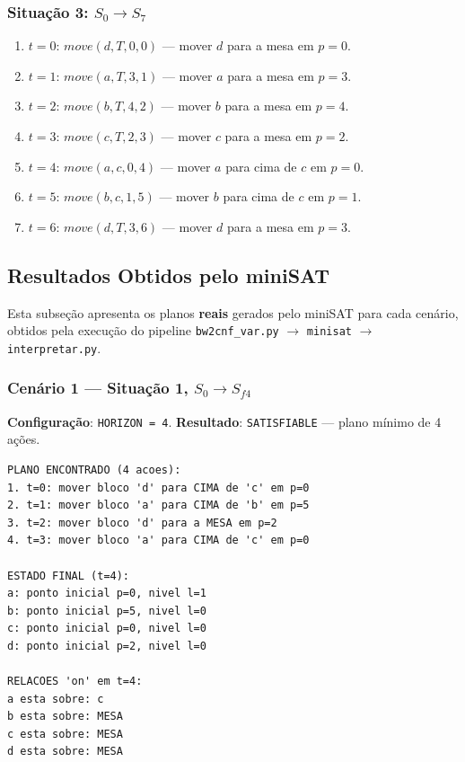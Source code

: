 \documentclass[12pt,a4paper]{article}
\begin{document}
\subsubsection{Situação 3: $S_0 \to S_7$}

\begin{enumerate}[leftmargin=1.2cm]
    \item $t=0$: $move(d, T, 0, 0)$ — mover $d$ para a mesa em $p=0$.
    \item $t=1$: $move(a, T, 3, 1)$ — mover $a$ para a mesa em $p=3$.
    \item $t=2$: $move(b, T, 4, 2)$ — mover $b$ para a mesa em $p=4$.
    \item $t=3$: $move(c, T, 2, 3)$ — mover $c$ para a mesa em $p=2$.
    \item $t=4$: $move(a, c, 0, 4)$ — mover $a$ para cima de $c$ em $p=0$.
    \item $t=5$: $move(b, c, 1, 5)$ — mover $b$ para cima de $c$ em $p=1$.
    \item $t=6$: $move(d, T, 3, 6)$ — mover $d$ para a mesa em $p=3$.
\end{enumerate}

\subsection{Resultados Obtidos pelo miniSAT}

Esta subseção apresenta os planos \textbf{reais} gerados pelo miniSAT para cada cenário, obtidos pela execução do pipeline \texttt{bw2cnf\_var.py} $\to$ \texttt{minisat} $\to$ \texttt{interpretar.py}.

\subsubsection{Cenário 1 — Situação 1, $S_0 \to S_{f4}$}

\textbf{Configuração}: \texttt{HORIZON = 4}. \textbf{Resultado}: \texttt{SATISFIABLE} — plano mínimo de 4 ações.

\begin{lstlisting}
PLANO ENCONTRADO (4 acoes):
1. t=0: mover bloco 'd' para CIMA de 'c' em p=0
2. t=1: mover bloco 'a' para CIMA de 'b' em p=5
3. t=2: mover bloco 'd' para a MESA em p=2
4. t=3: mover bloco 'a' para CIMA de 'c' em p=0

ESTADO FINAL (t=4):
a: ponto inicial p=0, nivel l=1
b: ponto inicial p=5, nivel l=0
c: ponto inicial p=0, nivel l=0
d: ponto inicial p=2, nivel l=0

RELACOES 'on' em t=4:
a esta sobre: c
b esta sobre: MESA
c esta sobre: MESA
d esta sobre: MESA
\end{lstlisting}
\end{document}
